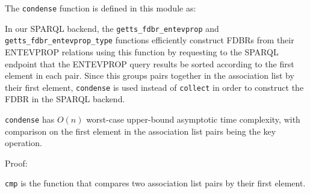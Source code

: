 \documentclass[../main.tex]{subfiles}
\begin{document}
The \texttt{condense} function is defined in this module as:


In our SPARQL backend, the \texttt{getts\_fdbr\_entevprop} and \texttt{getts\_fdbr\_entevprop\_type} functions efficiently construct FDBRs from their ENTEVPROP relations using this function by requesting to the SPARQL endpoint that the ENTEVPROP query results be sorted according to the first element in each pair.  Since this groups pairs together in the association list by their first element, \texttt{condense} is used instead of \texttt{collect} in order to construct the FDBR in the SPARQL backend.

\begin{theorem}
	\texttt{condense} has $O(n)$ worst-case upper-bound asymptotic time complexity, with comparison on the first element in the association list pairs being the key operation.
\end{theorem}

Proof:

\texttt{cmp} is the function that compares two association list pairs by their first element.  







\end{document}
